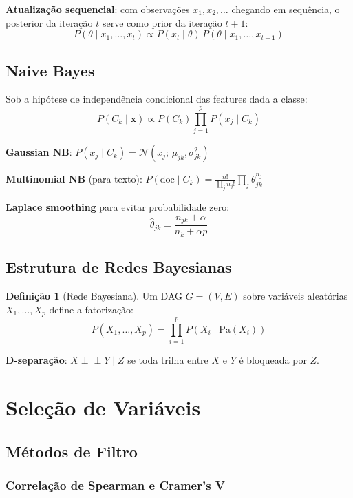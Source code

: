 \documentclass[12pt,a4paper,twoside]{book}
\theoremstyle{definition}
\newtheorem{definicao}{Definição}[chapter]
\theoremstyle{remark}
\newcommand{\N}{\mathcal{N}}
\newcommand{\bx}{\bm{x}}
\begin{document}
\textbf{Atualização sequencial}: com observações $x_1, x_2, \ldots$ chegando em sequência, o posterior da iteração $t$ serve como prior da iteração $t+1$:
\[
P(\theta \mid x_1,\ldots,x_t) \propto P(x_t \mid \theta)\, P(\theta \mid x_1,\ldots,x_{t-1})
\]

\section{Naive Bayes}

Sob a hipótese de independência condicional das features dada a classe:
\[
P(C_k \mid \bx) \propto P(C_k)\prod_{j=1}^p P(x_j \mid C_k)
\]

\textbf{Gaussian NB}: $P(x_j \mid C_k) = \N(x_j;\, \mu_{jk}, \sigma_{jk}^2)$

\textbf{Multinomial NB} (para texto): $P(\text{doc} \mid C_k) = \frac{n!}{\prod_j n_j!}\prod_j \theta_{jk}^{n_j}$

\textbf{Laplace smoothing} para evitar probabilidade zero:
\[
\hat{\theta}_{jk} = \frac{n_{jk} + \alpha}{n_k + \alpha p}
\]

\section{Estrutura de Redes Bayesianas}

\begin{definicao}[Rede Bayesiana]
Um DAG $G = (V, E)$ sobre variáveis aleatórias $X_1,\ldots,X_p$ define a fatorização:
\[
P(X_1,\ldots,X_p) = \prod_{i=1}^p P(X_i \mid \mathrm{Pa}(X_i))
\]
\end{definicao}

\textbf{D-separação}: $X \perp\!\!\!\perp Y \mid Z$ se toda trilha entre $X$ e $Y$ é bloqueada por $Z$.

\chapter{Seleção de Variáveis}

\section{Métodos de Filtro}

\subsection{Correlação de Spearman e Cramer's V}
\end{document}
